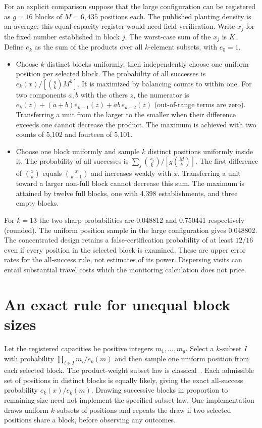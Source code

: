 \documentclass[10pt]{article}
\begin{document}
For an explicit comparison suppose that the large configuration can be registered as $g=16$ blocks of $M=6{,}435$ positions each. The published planting density is an average; this equal-capacity register would need field verification. Write $x_j$ for the fixed number established in block $j$. The worst-case sum of the $x_j$ is $K$. Define $e_k$ as the sum of the products over all $k$-element subsets, with $e_0=1$.
\begin{itemize}
\item Choose $k$ distinct blocks uniformly, then independently choose one uniform position per selected block. The probability of all successes is $e_k(x)/[\binom gk M^k]$. It is maximized by balancing counts to within one. For two components $a,b$ with the others $z$, the numerator is $e_k(z)+(a+b)e_{k-1}(z)+ab\,e_{k-2}(z)$ (out-of-range terms are zero). Transferring a unit from the larger to the smaller when their difference exceeds one cannot decrease the product. The maximum is achieved with two counts of 5,102 and fourteen of 5,101.
\item Choose one block uniformly and sample $k$ distinct positions uniformly inside it. The probability of all successes is $\sum_j\binom{x_j}{k}/[g\binom Mk]$. The first difference of $\binom{x}{k}$ equals $\binom{x}{k-1}$ and increases weakly with $x$. Transferring a unit toward a larger non-full block cannot decrease this sum. The maximum is attained by twelve full blocks, one with 4,398 establishments, and three empty blocks.
\end{itemize}
For $k=13$ the two sharp probabilities are 0.048812 and 0.750441 respectively (rounded). The uniform position sample in the large configuration gives 0.048802. The concentrated design retains a false-certification probability of at least $12/16$ even if every position in the selected block is examined. These are upper error rates for the all-success rule, not estimates of its power. Dispersing visits can entail substantial travel costs which the monitoring calculation does not price.

\section{An exact rule for unequal block sizes}
Let the registered capacities be positive integers $m_1,\ldots,m_g$. Select a $k$-subset $I$ with probability $\prod_{i\in I}m_i/e_k(m)$ and then sample one uniform position from each selected block. The product-weight subset law is classical~\cite{weights}. Each admissible set of positions in distinct blocks is equally likely, giving the exact all-success probability $e_k(x)/e_k(m)$. Drawing successive blocks in proportion to remaining size need not implement the specified subset law. One implementation draws uniform $k$-subsets of positions and repeats the draw if two selected positions share a block, before observing any outcomes.
\end{document}
